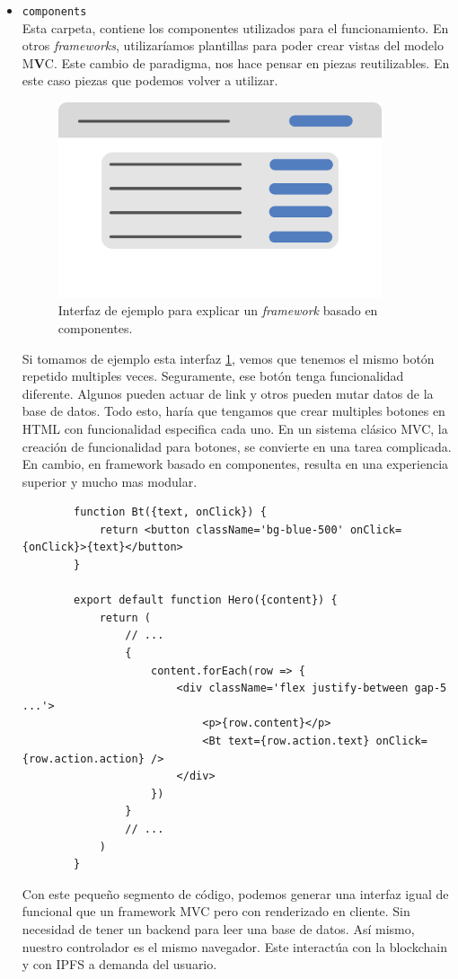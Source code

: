 \begin{itemize}
    \item \verb|components|\\
    Esta carpeta, contiene los componentes utilizados para el funcionamiento.
    En otros \textit{frameworks}, utilizaríamos plantillas para poder crear vistas del modelo M\textbf{V}C. Este cambio de paradigma, nos hace pensar en piezas reutilizables. En este caso piezas que podemos volver a utilizar.
    \begin{figure}[h!]
        \centering
        \includegraphics[width=0.9\textwidth]{Figures/Example UI.png}
        \caption{Interfaz de ejemplo para explicar un \textit{framework} basado en componentes.}
        \label{fg:ui}
    \end{figure}
    Si tomamos de ejemplo esta interfaz \ref{fg:ui}, vemos que tenemos el mismo botón repetido multiples veces. Seguramente, ese botón tenga funcionalidad diferente. Algunos pueden actuar de link y otros pueden mutar datos de la base de datos.
    Todo esto, haría que tengamos que crear multiples botones en HTML con funcionalidad especifica cada uno. En un sistema clásico MVC, la creación de funcionalidad para botones, se convierte en una tarea complicada.
    En cambio, en framework basado en componentes, resulta en una experiencia superior y mucho mas modular.
    \begin{lstlisting}
        function Bt({text, onClick}) {
            return <button className='bg-blue-500' onClick={onClick}>{text}</button>
        }

        export default function Hero({content}) {
            return (
                // ...
                {
                    content.forEach(row => {
                        <div className='flex justify-between gap-5 ...'>
                            <p>{row.content}</p>
                            <Bt text={row.action.text} onClick={row.action.action} />
                        </div>
                    })
                }
                // ...
            )
        }
    \end{lstlisting}
    Con este pequeño segmento de código, podemos generar una interfaz igual de funcional que un framework MVC pero con renderizado en cliente. Sin necesidad de tener un backend para leer una base de datos. Así mismo, nuestro controlador es el mismo navegador. Este interactúa con la blockchain y con IPFS a demanda del usuario.
\end{itemize}
